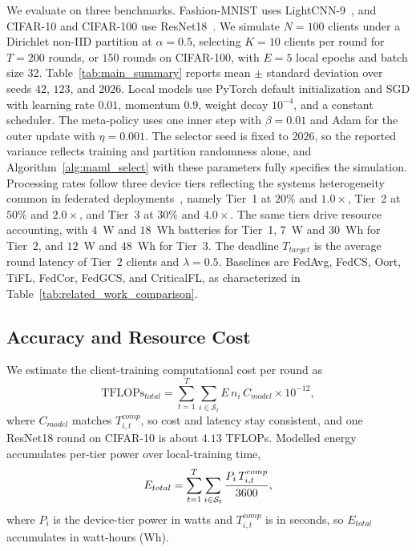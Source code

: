 \documentclass[journal]{IEEEtran}
\theoremstyle{remark}
\newcommand{\revision}[1]{#1}
\begin{document}
\revision{We evaluate on three benchmarks. Fashion-MNIST uses LightCNN-9~\cite{wu2018light}, and CIFAR-10 and CIFAR-100 use ResNet18~\cite{he2016deep}.} \revision{We simulate $N = 100$ clients under a Dirichlet non-IID partition at $\alpha = 0.5$, selecting $K = 10$ clients per round for $T = 200$ rounds, or $150$ rounds on CIFAR-100, with $E = 5$ local epochs and batch size 32. Table~\ref{tab:main_summary} reports mean $\pm$ standard deviation over seeds $42$, $123$, and $2026$. Local models use PyTorch default initialization and SGD with learning rate $0.01$, momentum $0.9$, weight decay $10^{-4}$, and a constant scheduler. The meta-policy uses one inner step with $\beta=0.01$ and Adam for the outer update with $\eta=0.001$. The selector seed is fixed to $2026$, so the reported variance reflects training and partition randomness alone, and Algorithm~\ref{alg:maml_select} with these parameters fully specifies the simulation. Processing rates follow three device tiers reflecting the systems heterogeneity common in federated deployments~\cite{li2020federated}, namely Tier~1 at $20\%$ and $1.0\times$, Tier~2 at $50\%$ and $2.0\times$, and Tier~3 at $30\%$ and $4.0\times$. The same tiers drive resource accounting, with $4$~W and $18$~Wh batteries for Tier~1, $7$~W and $30$~Wh for Tier~2, and $12$~W and $48$~Wh for Tier~3.} {\color{black}The deadline $T_{target}$ is the average round latency of Tier~2 clients and $\lambda = 0.5$. \revision{Baselines are FedAvg, FedCS, Oort, TiFL, FedCor, FedGCS, and CriticalFL, as characterized in Table~\ref{tab:related_work_comparison}.}}

\subsection{\revision{Accuracy and Resource Cost}}
\revision{We estimate the client-training computational cost per round as}
\begin{equation}
	\text{TFLOPs}_{total} = \sum_{t=1}^{T} \sum_{i \in \mathcal{S}_t} E\, n_i\, C_{model} \times 10^{-12},
	\label{eq:tflops}
\end{equation}
\revision{where $C_{model}$ matches $T_{i,t}^{comp}$, so cost and latency stay consistent, and one ResNet18 round on CIFAR-10 is about $4.13$ TFLOPs. Modelled energy accumulates per-tier power over local-training time,}
\begin{equation}
\color{black}
E_{total}=\sum_{t=1}^{T}\sum_{i\in\mathcal{S}_t} \frac{P_i\,T_{i,t}^{comp}}{3600},
\label{eq:energy}
\end{equation}
\revision{where $P_i$ is the device-tier power in watts and $T_{i,t}^{comp}$ is in seconds, so $E_{total}$ accumulates in watt-hours (Wh).}
\end{document}
